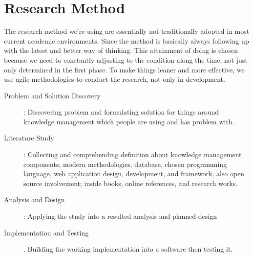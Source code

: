 \section{Research Method}
\label{sec:research-method}

The research method we're using are essentially not traditionally adopted in most current academic environments.
Since the method is basically always following up with the latest and better way of thinking.
This attainment of doing is chosen because we need to constantly adjusting to the condition along the time, not just only determined in the first phase.
To make things leaner and more effective, we use agile methodologies to conduct the research, not only in development.

\begin{description}
\item [Problem and Solution Discovery]:
Discovering problem and formulating solution for things around knowledge management which people are using and has problem with.
\item [Literature Study]:
Collecting and comprehending definition about knowledge management components, modern methodologies, database, chosen programming language, web application design, development, and framework, also open source involvement; inside books, online references, and research works.
\item [Analysis and Design]:
Applying the study into a resulted analysis and planned design
\item [Implementation and Testing].
Building the working implementation into a software then testing it.
\end{description}
